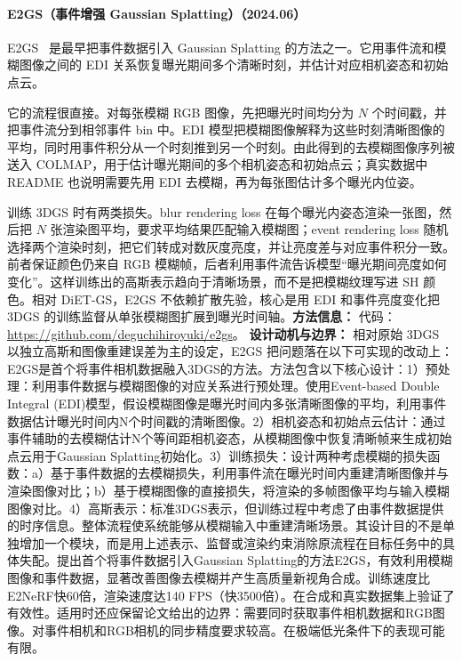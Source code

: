 \paragraph{E2GS（事件增强 Gaussian Splatting）（2024.06）}
E2GS~\cite{2406_14978} 是最早把事件数据引入 Gaussian Splatting 的方法之一。它用事件流和模糊图像之间的 EDI 关系恢复曝光期间多个清晰时刻，并估计对应相机姿态和初始点云。

它的流程很直接。对每张模糊 RGB 图像，先把曝光时间均分为 $N$ 个时间戳，并把事件流分到相邻事件 bin 中。EDI 模型把模糊图像解释为这些时刻清晰图像的平均，同时用事件积分从一个时刻推到另一个时刻。由此得到的去模糊图像序列被送入 COLMAP，用于估计曝光期间的多个相机姿态和初始点云；真实数据中 README 也说明需要先用 EDI 去模糊，再为每张图估计多个曝光内位姿。

训练 3DGS 时有两类损失。blur rendering loss 在每个曝光内姿态渲染一张图，然后把 $N$ 张渲染图平均，要求平均结果匹配输入模糊图；event rendering loss 随机选择两个渲染时刻，把它们转成对数灰度亮度，并让亮度差与对应事件积分一致。前者保证颜色仍来自 RGB 模糊帧，后者利用事件流告诉模型“曝光期间亮度如何变化”。这样训练出的高斯表示趋向于清晰场景，而不是把模糊纹理写进 SH 颜色。相对 DiET-GS，E2GS 不依赖扩散先验，核心是用 EDI 和事件亮度变化把 3DGS 的训练监督从单张模糊图扩展到曝光时间轴。\textbf{方法信息：} 代码：\url{https://github.com/deguchihiroyuki/e2gs}。
\textbf{设计动机与边界：} 相对原始 3DGS 以独立高斯和图像重建误差为主的设定，E2GS 把问题落在以下可实现的改动上：E2GS是首个将事件相机数据融入3DGS的方法。方法包含以下核心设计：1）预处理：利用事件数据与模糊图像的对应关系进行预处理。使用Event-based Double Integral (EDI)模型，假设模糊图像是曝光时间内多张清晰图像的平均，利用事件数据估计曝光时间内N个时间戳的清晰图像。2）相机姿态和初始点云估计：通过事件辅助的去模糊估计N个等间距相机姿态，从模糊图像中恢复清晰帧来生成初始点云用于Gaussian Splatting初始化。3）训练损失：设计两种考虑模糊的损失函数：a）基于事件数据的去模糊损失，利用事件流在曝光时间内重建清晰图像并与渲染图像对比；b）基于模糊图像的直接损失，将渲染的多帧图像平均与输入模糊图像对比。4）高斯表示：标准3DGS表示，但训练过程中考虑了由事件数据提供的时序信息。整体流程使系统能够从模糊输入中重建清晰场景。其设计目的不是单独增加一个模块，而是用上述表示、监督或渲染约束消除原流程在目标任务中的具体失配。提出首个将事件数据引入Gaussian Splatting的方法E2GS，有效利用模糊图像和事件数据，显著改善图像去模糊并产生高质量新视角合成。训练速度比E2NeRF快60倍，渲染速度达140 FPS（快3500倍）。在合成和真实数据集上验证了有效性。适用时还应保留论文给出的边界：需要同时获取事件相机数据和RGB图像。对事件相机和RGB相机的同步精度要求较高。在极端低光条件下的表现可能有限。
